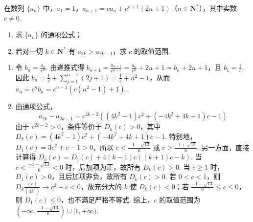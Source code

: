 \begin{problem}
在数列 \(\{a_{n}\}\) 中，\(a_{1} = 1\)，\(a_{n + 1} = c a_{n} + c^{n + 1}(2n + 1)\)（\(n \in \mathbf{N}^{*}\)），其中实数 \(c \neq 0\).

\begin{enumerate}
\item 求 \( \{a_{n}\} \) 的通项公式；
\item 若对一切 \(k \in \mathbf{N}^*\) 有 \(a_{2k} > a_{2k-1}\)，求 \(c\) 的取值范围.
\end{enumerate}

\begin{solution}
\begin{enumerate}
\item 令 \(b_n=\frac{a_n}{c^n}\). 由递推式得 \(b_{n+1}=\frac{a_{n+1}}{c^{n+1}}=\frac{a_n}{c^n}+2n+1=b_n+2n+1\)，且 \(b_1=\frac{1}{c}\). 因此 \(b_n=\frac{1}{c}+\sum_{j=1}^{n-1}(2j+1)=\frac{1}{c}+n^2-1\)，从而 \(a_n=c^n b_n=c^{n-1}\left(c(n^2-1)+1\right)\).
\item 由通项公式，
\[
a_{2k}-a_{2k-1}=c^{2k-2}\left((4k^2-1)c^2+(-4k^2+4k+1)c-1\right)
\]
由于 \(c^{2k-2}>0\)，条件等价于 \(D_k(c)>0\)，其中 \(D_k(c)=(4k^2-1)c^2+(-4k^2+4k+1)c-1\). 特别地，\(D_1(c)=3c^2+c-1>0\)，所以 \(c<\frac{-1-\sqrt{13}}{6}\) 或 \(c>\frac{-1+\sqrt{13}}{6}\). 另一方面，直接计算得 \(D_k(c)=D_1(c)+4(k-1)c((k+1)c-k)\). 当 \(c<\frac{-1-\sqrt{13}}{6}<0\) 时，后加项为正，故所有 \(D_k(c)>0\). 当 \(c\geqslant1\) 时，\(D_1(c)>0\)，且后加项非负，故所有 \(D_k(c)>0\). 若 \(0<c<1\)，则 \(D_k\frac{(c)}{(4k^2)}\to c^2-c<0\)，故充分大的 \(k\) 使 \(D_k(c)<0\)；若 \(\frac{-1-\sqrt{13}}{6}\leqslant c\leqslant0\)，则 \(D_1(c)\leqslant0\)，也不满足严格不等式. 综上，\(c\) 的取值范围为 \(\left(-\infty,\frac{-1-\sqrt{13}}{6}\right)\cup[1,+\infty)\).
\end{enumerate}
\end{solution}
\end{problem}
